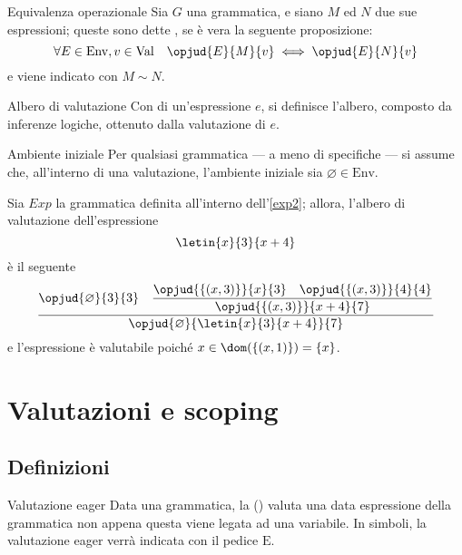 \documentclass[a4paper, 12pt]{report}
\begin{document}
    \begin{frameddefn}{Equivalenza operazionale}
        Sia $G$ una grammatica, e siano $M$ ed $N$ due sue espressioni; queste sono dette , se è vera la seguente proposizione: $$\forall E \in \mathrm{Env}, v \in \mathrm{Val} \quad \opjud{E}{M}{v} \iff \opjud{E}{N}{v}$$ e viene indicato con $M \sim N$.
    \end{frameddefn}

    \begin{frameddefn}{Albero di valutazione}
        Con  di un'espressione $e$, si definisce l'albero, composto da inferenze logiche, ottenuto dalla valutazione di $e$.
    \end{frameddefn}

    \begin{framedobs}{Ambiente iniziale}
        Per qualsiasi grammatica --- a meno di specifiche --- si assume che, all'interno di una valutazione, l'ambiente iniziale sia $\varnothing \in \mathrm{Env}$.
    \end{framedobs}

    \begin{example}
        Sia $Exp$ la grammatica definita all'interno dell'\cref{exp2}; allora, l'albero di valutazione dell'espressione $$\letin{x}{3}{x + 4}$$ è il seguente $$\dfrac{\opjud{\varnothing}{3}{3} \quad \dfrac{\opjud{\{(x, 3)\}}{x}{3} \quad \opjud{\{(x,3)\}}{4}{4}}{\opjud{\{(x, 3)\}}{x +4}{7}}}{\opjud{\varnothing}{\letin{x}{3}{x +4}}{7}}$$ e l'espressione è valutabile poiché $x \in \dom(\{(x,1)\}) = \{x\}$.
    \end{example}

    \section{Valutazioni e scoping}

    \subsection{Definizioni}

    \begin{frameddefn}{Valutazione eager}
        Data una grammatica, la  () valuta una data espressione della grammatica non appena questa viene legata ad una variabile. In simboli, la valutazione eager verrà indicata con il pedice $\mathrm{E}$.
    \end{frameddefn}
\end{document}
